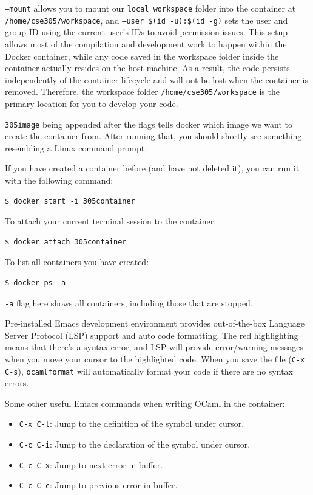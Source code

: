 \documentclass{extarticle}
\begin{document}
\texttt{--mount} allows you to mount our \texttt{local\_workspace} folder into the container
at \texttt{/home/cse305/workspace}, and \texttt{--user \$(id -u):\$(id -g)} sets the user and group ID using
the current user's IDs to avoid permission issues. This setup allows most of the compilation and development work to happen within the Docker container,
while any code saved in the workspace folder inside the container actually resides on the host machine.
As a result, the code persists independently of the container lifecycle and will not be lost when the container is removed.
Therefore, the workspace folder \texttt{/home/cse305/workspace} is the primary location for you to develop your code.

\texttt{305image} being appended after the flags tells docker which image we want to create the container from.
After running that, you should shortly see something resembling a Linux command prompt.


If you have created a container before (and have not deleted it), you can run it with the following command:
\begin{lstlisting}
$ docker start -i 305container
\end{lstlisting}

To attach your current terminal session to the container:
\begin{lstlisting}
$ docker attach 305container
\end{lstlisting}

To list all containers you have created:
\begin{lstlisting}
$ docker ps -a
\end{lstlisting}
\texttt{-a} flag here shows all containers, including those that are stopped.

Pre-installed Emacs development environment provides out-of-the-box
Language Server Protocol (LSP) support and auto code formatting.
The red highlighting means that there's a syntax error, and LSP will provide
error/warning messages when you move your cursor to the highlighted code.
When you save the file (\texttt{C-x C-s}), \texttt{ocamlformat} will
automatically format your code if there are no syntax errors.

Some other useful Emacs commands when writing OCaml in the container:
\begin{itemize}
  \item \texttt{C-x C-l}: Jump to the definition of the symbol under cursor.
  \item \texttt{C-c C-i}: Jump to the declaration of the symbol under cursor.
  \item \texttt{C-c C-x}: Jump to next error in buffer.
  \item \texttt{C-c C-c}: Jump to previous error in buffer.
\end{itemize}
\end{document}
